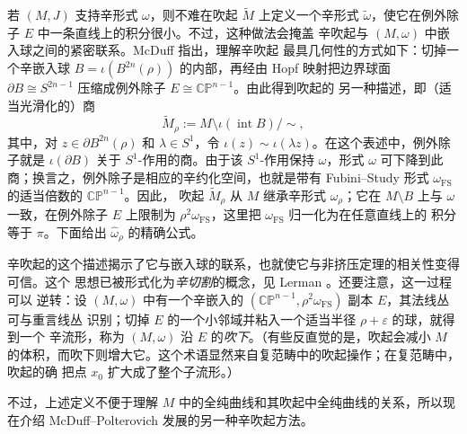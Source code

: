 若 $(M,J)$ 支持辛形式 $\omega$，则不难在吹起 $\widetilde M$ 上定义一个辛形式
$\widetilde\omega$，使它在例外除子 $E$ 中一条直线上的积分很小。不过，这种做法会掩盖
辛吹起与 $(M,\omega)$ 中嵌入球之间的紧密联系。McDuff  指出，理解辛吹起
最具几何性的方式如下：切掉一个辛嵌入球
$B=\iota(B^{2n}(\rho))$ 的内部，再经由 Hopf 映射把边界球面
$\partial B\cong S^{2n-1}$ 压缩成例外除子 $E\cong\mathbb{CP}^{n-1}$。由此得到吹起的
另一种描述，即（适当光滑化的）商
\[
  \widetilde M_\rho:=M\setminus\iota(\operatorname{int}B)\big/\sim,
\]
其中，对 $z\in\partial B^{2n}(\rho)$ 和 $\lambda\in S^1$，令
$\iota(z)\sim\iota(\lambda z)$。在这个表述中，例外除子就是
$\iota(\partial B)$ 关于 $S^1$-作用的商。由于该 $S^1$-作用保持 $\omega$，形式
$\omega$ 可下降到此商；换言之，例外除子是相应的辛约化空间，也就是带有
Fubini--Study 形式 $\omega_{\mathrm{FS}}$ 的适当倍数的 $\mathbb{CP}^{n-1}$。因此，
吹起 $\widetilde M_\rho$ 从 $M$ 继承辛形式 $\widehat\omega_\rho$；它在
$M\setminus B$ 上与 $\omega$ 一致，在例外除子 $E$ 上限制为
$\rho^2\omega_{\mathrm{FS}}$，这里把 $\omega_{\mathrm{FS}}$ 归一化为在任意直线上的
积分等于 $\pi$。下面给出 $\widehat\omega_\rho$ 的精确公式。

辛吹起的这个描述揭示了它与嵌入球的联系，也就使它与非挤压定理的相关性变得可信。这个
思想已被形式化为\emph{辛切割}的概念，见 Lerman 。还要注意，这一过程可以
逆转：设 $(M,\omega)$ 中有一个辛嵌入的
$(\mathbb{CP}^{n-1},\rho^2\omega_{\mathrm{FS}})$ 副本 $E$，其法线丛可与重言线丛
识别；切掉 $E$ 的一个小邻域并粘入一个适当半径 $\rho+\varepsilon$ 的球，就得到一个
辛流形，称为 $(M,\omega)$ 沿 $E$ 的\emph{吹下}。（有些反直觉的是，吹起会减小
$M$ 的体积，而吹下则增大它。这个术语显然来自复范畴中的吹起操作；在复范畴中，吹起的确
把点 $x_0$ 扩大成了整个子流形。）

不过，上述定义不便于理解 $M$ 中的全纯曲线和其吹起中全纯曲线的关系，所以现在介绍
McDuff--Polterovich  发展的另一种辛吹起方法。


